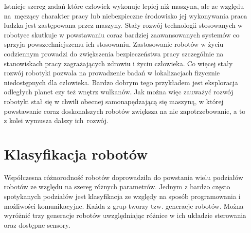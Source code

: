 Istnieje szereg zadań które człowiek wykonuje lepiej niż maszyna, ale ze względu
na~męczący charakter pracy lub niebezpieczne środowisko jej wykonywania praca
ludzka jest zastępowana przez maszyny. Stały rozwój technologii stosowanych w
robotyce skutkuje w powstawaniu coraz bardziej zaawansowanych systemów co sprzyja
powszechniejszemu ich stosowaniu. Zastosowanie robotów w życiu codziennym
prowadzi do zwiększenia bezpieczeństwa pracy szczególnie na stanowiskach pracy
zagrażających zdrowiu i życiu człowieka. Co więcej stały rozwój robotyki pozwala
na prowadzenie badań w lokalizacjach fizycznie niedostępnych dla człowieka.
Bardzo dobrym tego przykładem jest eksploracja odległych planet czy też wnętrz
wulkanów. Jak można więc zauważyć rozwój robotyki stał się w chwili obecnej
samonapędzającą się maszyną, w której powstawanie coraz doskonalszych robotów
zwiększa na nie zapotrzebowanie, a to z kolei wymusza dalszy ich~rozwój.
\newpage\section{Klasyfikacja robotów} Współczesna różnorodność robotów
doprowadziła do powstania wielu podziałów robotów ze względu na szereg różnych
parametrów. Jednym z bardzo często spotykanych podziałów jest klasyfikacja ze
względy na sposób programowania i możliwości komunikacyjne. Każda z grup tworzy
tzw. generacje robotów. Można wyróżnić trzy generacje robotów uwzględniając
różnice w ich układzie sterowania oraz dostępne
sensory\cite{website:robotyka-pl}.
